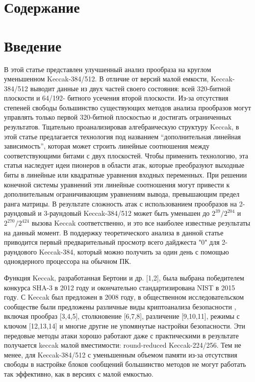 \documentclass[utf8,14pt,a4paper,oneside,russian]{book}
\makeatletter
\renewcommand{\tableofcontents}{\section*{Содержание}\markboth{Содержание}{}\@starttoc{toc}\newpage}
\makeatother
\begin{document}
\tableofcontents

\section{Введение}

В этой статье представлен улучшенный анализ прообраза на круглом уменьшенном Keccak-384/512.
В отличие от версий малой емкости, Keccak-384/512 выводит данные из двух частей своего состояния: всей 320-битной плоскости и 64/192-
битного усечения второй плоскости. Из-за отсутствия степеней свободы большинство существующих методов анализа прообразов могут
управлять только первой 320-битной плоскостью и достигать ограниченных результатов. Тщательно проанализировав алгебраическую структуру
Keccak, в этой статье предлагается технология под названием “дополнительная линейная зависимость”, которая может строить
линейные соотношения между соответствующими битами с двух плоскостей. Чтобы применить технологию, эта статья наследует идеи пионеров
в области атак, которые преобразуют выходные биты в линейные или квадратные уравнения входных переменных. При решении конечной
системы уравнений эти линейные соотношения могут привести к дополнительным ограничивающим уравнениям вывода, превышающим
предел ранга матрицы. В результате сложность атак с использованием прообразов на 2-раундовый и 3-раундовый Keccak-384/512 может
быть уменьшен до $2^{39}/2^{204}$ и $2^{270}/2^{424}$ вызова Keccak соответственно, и это все наиболее известные результаты на данный момент.
В поддержку теоретического анализа в данной статье приводится первый предварительный просмотр всего дайджеста "0"
для 2-раундового Keccak-384, который можно получить за один день с помощью одноядерного процессора на обычном ПК.

Функция Keccak, разработанная Бертони и др. [1,2], была выбрана победителем
конкурса SHA-3 в 2012 году и окончательно стандартизирована NIST в 2015 году. С
Keccak был предложен в 2008 году, в общественном исследовательском сообществе были предложены различные виды криптоанализа безопасности
, включая прообраз [3,4,5], столкновение [6,7,8],
различение [9,10,11], режимы с ключом [12,13,14] и многие другие не упомянутые
настройки безопасности. Эти передовые методы атаки хорошо работают даже с практическими
в результате получается keccak малой вместимости: round-reduced Keccak-224/256. Тем не менее, для Keccak-384/512 с
уменьшенным объемом памяти из-за отсутствия свободы в настройке блоков сообщений большинство методов не могут работать так
эффективно, как в версиях с малой емкостью.
\end{document}
